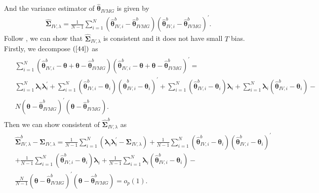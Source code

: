 \documentclass[12pt,a4paper,hyperref]{article}
\begin{document}
And the variance estimator of $\hat{\boldsymbol{\theta}}_{IVMG}$ is given by
\begin{align}
\hat{\boldsymbol{\Sigma}}_{IV,\lambda}=\frac{1}{N-1}\sum^{N}_{i=1}\left( \hat{\boldsymbol{\theta}}^{b}_{IV,i}- \hat{\boldsymbol{\theta}}^{b}_{IVMG}\right)\left( \hat{\boldsymbol{\theta}}^{b}_{IV,i}- \hat{\boldsymbol{\theta}}^{b}_{IVMG}\right)^{'}. \label{44}
\end{align}
Follow \citet{Norkute:2019}, we can show that $\hat{\boldsymbol{\Sigma}}_{IV,\lambda}$ is consistent and it does not have small $T$ bias.
Firstly, we decompose $(\ref{44})$ as
\begin{align}
\begin{split}
&\sum^{N}_{i=1}\left( \hat{\boldsymbol{\theta}}^{b}_{IV,i}- \boldsymbol{\theta}+\boldsymbol{\theta}-    \hat{\boldsymbol{\theta}}^{b}_{IVMG}\right)\left( \hat{\boldsymbol{\theta}}^{b}_{IV,i}- \boldsymbol{\theta}+\boldsymbol{\theta}-    \hat{\boldsymbol{\theta}}^{b}_{IVMG}\right)^{'}= \\
& \sum^{N}_{i=1} \boldsymbol{\lambda}_{i}\boldsymbol{\lambda}^{'}_{i}+\sum^{N}_{i=1}\left(\hat{\boldsymbol{\theta}}^{b}_{IV,i}-\boldsymbol{\theta}_{i} \right)\left(\hat{\boldsymbol{\theta}}^{b}_{IV,i}-\boldsymbol{\theta}_{i} \right)^{'}+\sum^{N}_{i=1}\left(\hat{\boldsymbol{\theta}}^{b}_{IV,i}-\boldsymbol{\theta}_{i}  \right) \boldsymbol{\lambda}_{i}+\sum^{N}_{i=1}\boldsymbol{\lambda}_{i} \left(\hat{\boldsymbol{\theta}}^{b}_{IV,i}-\boldsymbol{\theta}_{i}  \right) -\\
&N\left(\boldsymbol{\theta}-\hat{\boldsymbol{\theta}}^{b}_{IVMG} \right)^{'}\left(\boldsymbol{\theta}-\hat{\boldsymbol{\theta}}^{b}_{IVMG} \right). \label{45}
\end{split}
\end{align}
Then we can show consistent of $\hat{\boldsymbol{\Sigma}}^{b}_{IV,\lambda}$ as
\begin{align}
\begin{split}
&\hat{\boldsymbol{\Sigma}}^{b}_{IV,\lambda}-\boldsymbol{\Sigma}_{IV,\lambda}=
 \frac{1}{N-1}\sum^{N}_{i=1}\left( \boldsymbol{\lambda}_{i}\boldsymbol{\lambda}^{'}_{i}-\boldsymbol{\Sigma}_{IV,\lambda}\right) +\frac{1}{N-1}\sum^{N}_{i=1}\left(\hat{\boldsymbol{\theta}}^{b}_{IV,i}-\boldsymbol{\theta}_{i} \right)\left(\hat{\boldsymbol{\theta}}^{b}_{IV,i}-\boldsymbol{\theta}_{i} \right)^{'} \\
&+\frac{1}{N-1}\sum^{N}_{i=1}\left(\hat{\boldsymbol{\theta}}^{b}_{IV,i}-\boldsymbol{\theta}_{i}  \right) \boldsymbol{\lambda}_{i}+\frac{1}{N-1}\sum^{N}_{i=1}\boldsymbol{\lambda}_{i} \left(\hat{\boldsymbol{\theta}}^{b}_{IV,i}-\boldsymbol{\theta}_{i}  \right) -\\
&\frac{N}{N-1}\left(\boldsymbol{\theta}-\hat{\boldsymbol{\theta}}^{b}_{IVMG} \right)^{'}\left(\boldsymbol{\theta}-\hat{\boldsymbol{\theta}}^{b}_{IVMG} \right)  =o_{p}(1).
\end{split}
\end{align}
\end{document}
